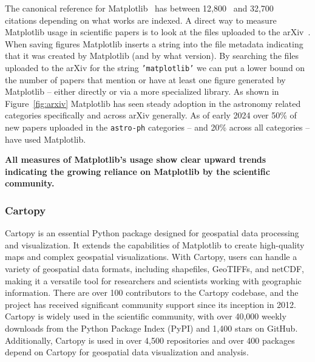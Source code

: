 \documentclass[12pt]{article}
\numberwithin{page}{section}
\begin{document}
The canonical reference for
Matplotlib~\cite{Hunter:2007} has between 12,800~\cite{ads_mpl} and
32,700~\cite{gs_cites} citations depending on what works are indexed.  A direct
way to measure Matplotlib usage in scientific papers is to look at the files
uploaded to the arXiv~\cite{arxiv_stats}.  When saving figures Matplotlib
inserts a string into the file metadata indicating that it was created by
Matplotlib (and by what version).  By searching the files uploaded to the arXiv
for the string \texttt{'matplotlib'} we can put a lower bound
on the number of papers that mention or have at least one figure generated by
Matplotlib -- either directly or via a more specialized library.  As shown in
Figure~\ref{fig:arxiv} Matplotlib has seen steady adoption in the astronomy
related categories specifically and across arXiv generally.  As of early 2024
over 50\% of new papers uploaded in the \texttt{astro-ph} categories -- and
20\% across all categories -- have used Matplotlib.

\textbf{All measures of Matplotlib's usage show clear upward trends indicating the
growing reliance on Matplotlib by the scientific community.}

\subsubsection{Cartopy}

Cartopy is an essential Python package designed for geospatial data processing and visualization.
It extends the capabilities of Matplotlib
to create high-quality maps and complex geospatial visualizations.
With Cartopy, users can handle a variety of geospatial data formats,
including shapefiles, GeoTIFFs, and netCDF,
making it a versatile tool for researchers and scientists working with geographic information.
There are over 100 contributors to the Cartopy codebase, and the project has received
significant community support since its inception in 2012. Cartopy is widely used in the
scientific community, with over 40,000 weekly downloads from the Python Package Index (PyPI)
and 1,400 stars on GitHub. Additionally, Cartopy is used in over 4,500 repositories and
over 400 packages depend on Cartopy for geospatial data visualization and analysis.
\end{document}
